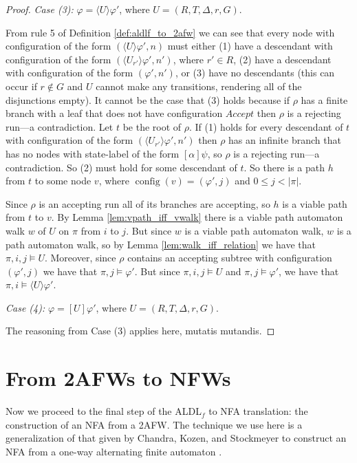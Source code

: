 \documentclass[10pt,a4paper]{amsart}
\theoremstyle{plain}
\theoremstyle{definition}
\theoremstyle{definition}
\newcommand{\dbox}[1]{\langle #1 \rangle}
\newcommand{\bbox}[1]{[ #1 ]}
\DeclareMathOperator{\config}{config}
\DeclareMathOperator{\?}{?}
\begin{document}
\begin{proof}
    \textit{Case (3):} $\varphi = \dbox{U}\varphi'$, where $U = (R,T,\Delta,r,G)$.

    From rule 5 of Definition \ref{def:aldlf_to_2afw} we can see that every node with configuration of the form $(\dbox{U}\varphi',n)$
    must either (1) have a descendant with configuration of the form $(\dbox{U_{r'}}\varphi',n')$, where $r' \in R$, (2) have a descendant with
    configuration of the form $(\varphi',n')$, or (3) have no descendants (this can occur if $r \not\in G$ and $U$ cannot make
    any transitions, rendering all of the disjunctions empty). It cannot be the case that (3) holds because if $\rho$ has a finite
    branch with a leaf that does not have configuration $Accept$ then $\rho$ is a rejecting run---a contradiction. Let $t$ be the root
    of $\rho$. If (1) holds for every descendant of $t$ with configuration of the form $(\dbox{U_{r'}}\varphi',n')$ then
    $\rho$ has an infinite branch that has no nodes with state-label of the form $\bbox{\alpha}\psi$, so $\rho$ is a rejecting run---a contradiction.
    So (2) must hold for some descendant of $t$. So there is a path $h$ from $t$ to some node $v$,
    where $\config(v) = (\varphi',j)$ and $0 \leq j < |\pi|$.

    Since $\rho$ is an accepting run all of its branches are accepting, so $h$ is a viable path from $t$ to $v$.
    By Lemma \ref{lem:vpath_iff_vwalk} there is a viable path automaton walk $w$ of $U$ on $\pi$ from $i$ to $j$. But since $w$ is a viable
    path automaton walk, $w$ is a path automaton walk, so by Lemma \ref{lem:walk_iff_relation} we have that $\pi,i,j \models U$.
    Moreover, since $\rho$ contains an accepting subtree with configuration $(\varphi',j)$ we have that $\pi,j \models \varphi'$.
    But since $\pi,i,j \models U$ and $\pi,j \models \varphi'$, we have that $\pi,i \models \dbox{U}\varphi'$.

    \textit{Case (4):} $\varphi = \bbox{U}\varphi'$, where $U = (R,T,\Delta,r,G)$.

    The reasoning from Case (3) applies here, mutatis mutandis.
\end{proof}



\section{From 2AFWs to NFWs}
\label{ch:2afwtonfw}

Now we proceed to the final step of the ALDL$_f$ to NFA translation: the construction of an NFA from a 2AFW. The technique we use here is a generalization of that given by Chandra, Kozen, and Stockmeyer to construct an NFA from a one-way alternating finite automaton \cite{chandra}.
\end{document}
